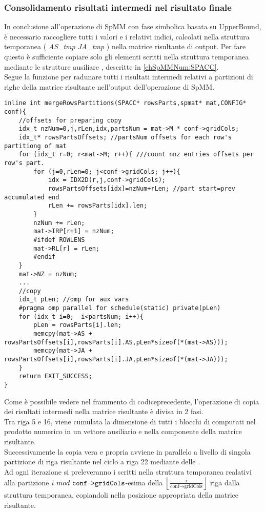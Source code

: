 \subsubsection{Consolidamento risultati intermedi nel risultato finale} \label{chSpMMNum:mergeRows}
In conclusione all'operazione di SpMM con fase simbolica basata su UpperBound, 
è necessario raccogliere tutti i valori \nnz e i relativi indici,
calcolati nella struttura temporanea ( \emph{AS\_tmp JA\_tmp} ) nella matrice risultante di output.
Per fare questo è sufficiente copiare solo gli elementi \nnz scritti nella struttura temporanea
mediante le strutture ausiliare , descritte in \ref{chSpMMNum:SPACC}.\\
Segue la funzione per radunare tutti i risultati intermedi relativi a partizioni di righe della matrice 
risultante nell'output dell'operazione di SpMM.\\
\begin{lstlisting}
inline int mergeRowsPartitions(SPACC* rowsParts,spmat* mat,CONFIG* conf){
	//offsets for preparing copy 
    idx_t nzNum=0,j,rLen,idx,partsNum = mat->M * conf->gridCols;
    idx_t* rowsPartsOffsets; //partsNum offsets for each row's partitiong of mat
    for (idx_t r=0; r<mat->M; r++){	///count nnz entries offsets per row's part.
        for (j=0,rLen=0; j<conf->gridCols; j++){
            idx = IDX2D(r,j,conf->gridCols);
            rowsPartsOffsets[idx]=nzNum+rLen; //part start=prev accumulated end
            rLen += rowsParts[idx].len;
        }
        nzNum += rLen;
        mat->IRP[r+1] = nzNum;
		#ifdef ROWLENS
        mat->RL[r] = rLen;
		#endif
    }
    mat->NZ = nzNum;
	...
	//copy
    idx_t pLen; //omp for aux vars
    #pragma omp parallel for schedule(static) private(pLen)
    for (idx_t i=0;  i<partsNum; i++){
        pLen = rowsParts[i].len;
        memcpy(mat->AS + rowsPartsOffsets[i],rowsParts[i].AS,pLen*sizeof(*(mat->AS)));
        memcpy(mat->JA + rowsPartsOffsets[i],rowsParts[i].JA,pLen*sizeof(*(mat->JA)));
    }
    return EXIT_SUCCESS;
}
\end{lstlisting}
Come è possibile vedere nel frammento di codiceprecedente, l'operazione di copia dei risultati
intermedi nella matrice risultante è divisa in 2 fasi.\\
Tra riga 5 e 16, viene cumulata la dimensione di tutti i blocchi di \nnz computati
nel prodotto numerico in un vettore ausiliario  e nella componente 
 della matrice risultante.\\
Successivamente la copia vera e propria avviene in parallelo 
a livello di singola partizione di riga risultante nel ciclo a riga 22 mediante delle .\\
Ad ogni iterazione si preleveranno i \nnz scritti nella struttura temporanea realativi
alla partizione $i~mod~ \verb|conf->gridCols|$-esima della $\left\lfloor \frac{i}{\text{conf} \rightarrow \text{gridCols}} \right\rfloor$
riga dalla struttura temporanea, copiandoli nella posizione appropriata della matrice risultante.\\



